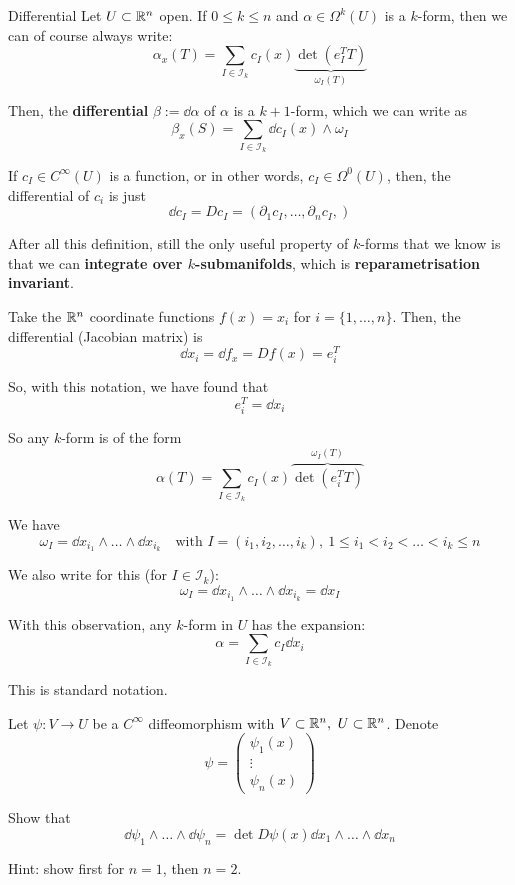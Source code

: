 \documentclass[12pt]{article}
\begin{document}
\begin{definition}{Differential}{}
    Let $U \subset \mathbb{R}^n$ open. If $0 \leq k \leq n$ and $\alpha \in \Omega^k(U)$ is a $k$-form, then we can of course always write:
    \[
        \alpha_x(T) = \sum_{I \in \mathcal{I}_k} c_I(x) \underbrace{\det(e_I^T T)}_{\omega_I(T)}
    \]

    Then, the \textbf{differential} $\beta := \dd \alpha$ of $\alpha$ is a $k+1$-form, which we can write as
    \[
        \beta_x(S) = \sum_{I \in \mathcal{I}_k} \dd c_I(x) \land \omega_I
    \]
\end{definition}

If $c_I \in C^\infty(U)$ is a function, or in other words, $c_I \in \Omega^0(U)$, then, the differential of $c_i$ is just
\[
    \dd c_I = Dc_I = \left( \partial_1 c_I, \dots, \partial_n c_I, \right)
\]

After all this definition, still the only useful property of $k$-forms that we know is that we can \textbf{integrate over $k$-submanifolds}, which is \textbf{reparametrisation invariant}.

\begin{remark}{}{}
    Take the $\mathbb{R}^n$ coordinate functions $f(x) = x_i$ for $i = \{1,\dots,n\}$. Then, the differential (Jacobian matrix) is
    \[
        \dd x_i = \dd f_x = Df(x) = e_i^T
    \]

    So, with this notation, we have found that
    \[
        \boxed{e_i^T = \dd x_i}
    \]

    So any $k$-form is of the form
    \[
        \alpha(T) = \sum_{I \in \mathcal{I}_k} c_I(x) \overbrace{\det(e_i^T T)}^{\omega_I(T)}
    \]

    We have
    \[
        \omega_I = \dd x_{i_1} \land \dots \land \dd x_{i_k} \quad \text{with } I = (i_1,i_2,\dots,i_k),\ 1 \leq i_1 < i_2 < \dots < i_k \leq n
    \]

    We also write for this (for $I \in \mathcal{I}_k$):
    \[
        \omega_I = \dd x_{i_1} \land \dots \land \dd x_{i_k} = \boxed{\dd x_I}
    \]

    With this observation, any $k$-form in $U$ has the expansion:
    \[
        \boxed{\alpha = \sum_{I \in \mathcal{I}_k} c_I \dd x_i}
    \]

    This is standard notation.
\end{remark}

\begin{exercise}{}{}
    Let $\psi: V \rightarrow U$ be a $C^\infty$ diffeomorphism with $V \subset \mathbb{R}^n,\ U \subset \mathbb{R}^n$. Denote
    \[
        \psi = \begin{pmatrix} \psi_1(x) \\ \vdots \\ \psi_n(x) \end{pmatrix}
    \]

    Show that
    \[
        \dd \psi_1 \land \dots \land \dd \psi_n = \det D \psi(x) \dd x_1 \land \dots \land \dd x_n
    \]

    Hint: show first for $n=1$, then $n=2$.
\end{exercise}
\end{document}
